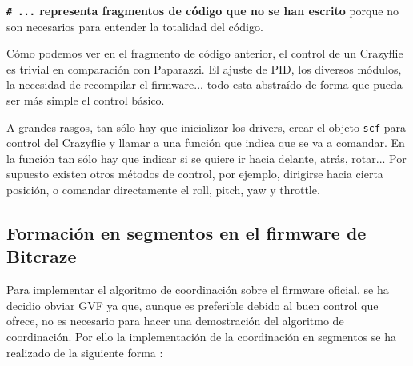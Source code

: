 \textbf{\texttt{\# ...} representa fragmentos de código que no se han escrito} 
porque no son necesarios para entender la totalidad del código.

Cómo podemos ver en el fragmento de código anterior, 
el control de un Crazyflie es trivial en comparación con Paparazzi.
El ajuste de PID, los diversos módulos, la necesidad de recompilar el firmware...
todo esta abstraído de forma que pueda ser más simple el control básico.

A grandes rasgos, tan sólo hay que inicializar los drivers, 
crear el objeto \texttt{scf} para control del Crazyflie y llamar a una función que indica que se va a comandar.
En la función tan sólo hay que indicar si se quiere ir hacia delante, atrás, rotar...
Por supuesto existen otros métodos de control, por ejemplo, dirigirse hacia cierta posición, o comandar
directamente el roll, pitch, yaw y throttle.


\subsection{Formación en segmentos en el firmware de Bitcraze}

Para implementar el algoritmo de coordinación sobre el firmware oficial, 
se ha decidio obviar GVF ya que, aunque es preferible debido al buen control que ofrece,
no es necesario para hacer una demostración del algoritmo de coordinación.
Por ello la implementación de la coordinación en segmentos se ha realizado de la siguiente forma \cite{crazyradio-swarm-interface}:

